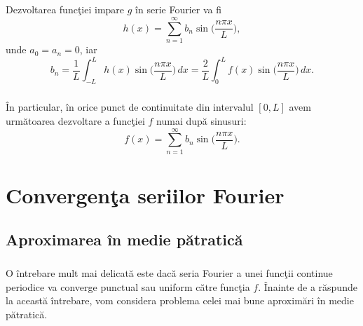 \documentclass[a4paper,openany,12pt]{report}
\begin{document}
\paragraph*{} Dezvoltarea func\c tiei impare $g$ \^ in serie Fourier va fi
 \begin{equation*}
h(x)=\sum_{n=1}^{\infty}b_n\sin\Big(\frac{n\pi x}{L}\Big),
\end{equation*}
unde $a_0=a_n=0$, iar
\begin{equation*}
b_n=\frac{1}{L}\int_{-L}^Lh(x)\sin\Big(\frac{n\pi x}{L}\Big)\, dx=\frac{2}{L}\int_0^Lf(x)\sin\Big(\frac{n\pi x}{L}\Big)\, dx.
\end{equation*}
\paragraph*{}\^ In particular, \^ in orice punct de continuitate din intervalul $[0, L]$ avem urm\u atoarea dezvoltare a func\c tiei $f$ numai dup\u a sinusuri:
\begin{equation*}
f(x)=\sum_{n=1}^{\infty}b_n\sin\Big(\frac{n\pi x}{L}\Big).
\end{equation*}







\chapter{Convergen\c ta seriilor Fourier}
\section{Aproximarea \^ in medie p\u atratic\u a}
\paragraph*{}O \^ intrebare mult mai delicat\u a este dac\u a seria Fourier a unei func\c tii continue periodice va converge punctual sau uniform c\u atre func\c tia $f$. \^ Inainte de a r\u aspunde la aceast\u a \^ intrebare, vom considera problema celei mai bune aproxim\u ari \^ in medie p\u atratic\u a.
\end{document}
